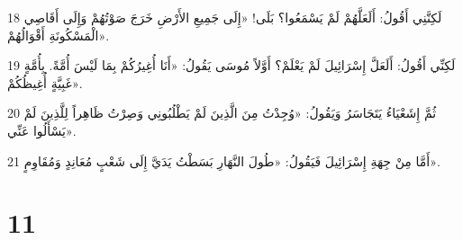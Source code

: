 \par 18 لَكِنَّنِي أَقُولُ: أَلَعَلَّهُمْ لَمْ يَسْمَعُوا؟ بَلَى! «إِلَى جَمِيعِ الأَرْضِ خَرَجَ صَوْتُهُمْ وَإِلَى أَقَاصِي الْمَسْكُونَةِ أَقْوَالُهُمْ».
\par 19 لَكِنِّي أَقُولُ: أَلَعَلَّ إِسْرَائِيلَ لَمْ يَعْلَمْ؟ أَوَّلاً مُوسَى يَقُولُ: «أَنَا أُغِيرُكُمْ بِمَا لَيْسَ أُمَّةً. بِأُمَّةٍ غَبِيَّةٍ أُغِيظُكُمْ».
\par 20 ثُمَّ إِشَعْيَاءُ يَتَجَاسَرُ وَيَقُولُ: «وُجِدْتُ مِنَ الَّذِينَ لَمْ يَطْلُبُونِي وَصِرْتُ ظَاهِراً لِلَّذِينَ لَمْ يَسْأَلُوا عَنِّي».
\par 21 أَمَّا مِنْ جِهَةِ إِسْرَائِيلَ فَيَقُولُ: «طُولَ النَّهَارِ بَسَطْتُ يَدَيَّ إِلَى شَعْبٍ مُعَانِدٍ وَمُقَاوِمٍ».

\chapter{11}

